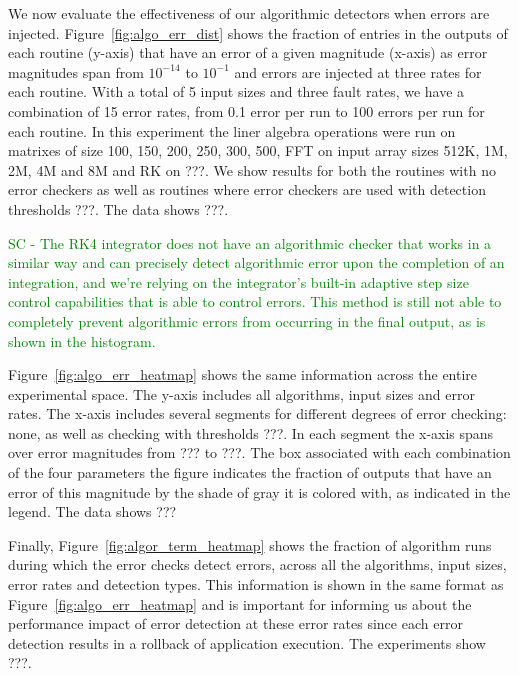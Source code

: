 \documentclass{sig-alternate}
\newcommand{\sui}[1]{%
  \textcolor{green}{SC - #1}
}
\begin{document}
We now evaluate the effectiveness of our algorithmic detectors when errors are injected.
Figure~\ref{fig:algo_err_dist} shows the fraction of entries in the outputs of each routine (y-axis) that have an error of a given magnitude (x-axis) as error magnitudes span from $10^{-14}$ to $10^{-1}$ and errors are injected at three rates for each routine. With a total of 5 input sizes and three fault rates, we have a combination of 15 error rates, from 0.1 error per run to 100 errors per run for each routine.
In this experiment the liner algebra operations were run on matrixes of size 100, 150, 200, 250, 300, 500, FFT on input array sizes 512K, 1M, 2M, 4M and 8M and RK on ???.
We show results for both the routines with no error checkers as well as routines where error checkers are used with detection thresholds ???.
The data shows ???.

\sui{The RK4 integrator does not have an algorithmic checker that works in a similar way and can precisely detect algorithmic error upon the completion of an integration, and we're relying on the integrator's built-in adaptive step size control capabilities that is able to control errors. This method is still not able to completely prevent algorithmic errors from occurring in the final output, as is shown in the histogram.}

Figure~\ref{fig:algo_err_heatmap} shows the same information across the entire experimental space.
The y-axis includes all algorithms, input sizes and error rates.
The x-axis includes several segments for different degrees of error checking: none, as well as checking with thresholds ???. In each segment the x-axis spans over error magnitudes from ??? to ???.
The box associated with each combination of the four parameters the figure indicates the fraction of outputs that have an error of this magnitude by the shade of gray it is colored with, as indicated in the legend.
The data shows ???


Finally, Figure~\ref{fig:algor_term_heatmap} shows the fraction of algorithm runs during which the error checks detect errors, across all the algorithms, input sizes, error rates and detection types.
This information is shown in the same format as Figure~\ref{fig:algo_err_heatmap} and is important for informing us about the performance impact of error detection at these error rates since each error detection results in a rollback of application execution.
The experiments show ???.
\end{document}
